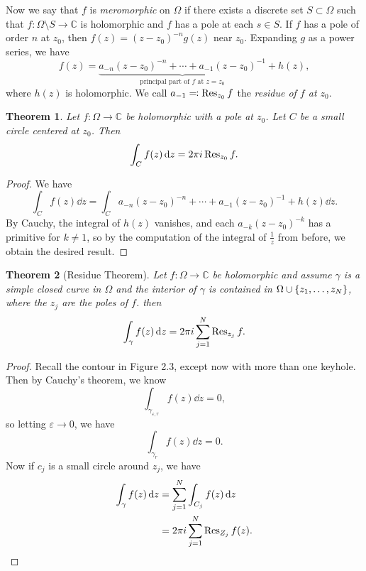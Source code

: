 \documentclass[leqno, openany]{memoir}
\newtheorem{thm}{Theorem}[section]
\theoremstyle{definition}
\theoremstyle{remark}
\theoremstyle{plain}
\theoremstyle{definition}
\theoremstyle{remark}
\newcommand{\C}{\mathbb{C}}
\newcommand{\ep}{\varepsilon}
\begin{document}
Now we say that $f$ is \textit{meromorphic} on $\Omega$ if there exists a discrete set $S \subset \Omega$ such that $f \colon \Omega \setminus S \to \C$ is holomorphic and $f$ has a pole at each $s \in S$. If $f$ has a pole of order $n$ at $z_0$, then $f(z) = (z-z_0)^{-n} g(z)$ near $z_0$. Expanding $g$ as a power series, we have
\[ f(z) = \underbrace{a_{-n} {(z-z_0)}^{-n} + \cdots + a_{-1} {(z-z_0)}^{-1}}_{\text{principal part of $f$ at $z=z_0$}} + h(z), \]
where $h(z)$ is holomorphic. We call $a_{-1} \eqqcolon \Res_{z_0} f$ the \textit{residue of $f$ at $z_0$}.

\begin{thm}
    Let $f \colon \Omega \to \C$ be holomorphic with a pole at $z_0$. Let $C$ be a small circle centered at $z_0$. Then 
    \[ \int_C f(z) \dd{z} = 2 \pi i \Res_{z_0} f. \]
\end{thm}

\begin{proof}
    We have
    \[ \int_C f(z) \dd{z} = \int_C a_{-n} {(z-z_0)}^{-n} + \cdots + a_{-1}{(z-z_0)}^{-1} + h(z) \dd{z}. \]
    By Cauchy, the integral of $h(z)$ vanishes, and each $a_{-k} {(z-z_0)}^{-k}$ has a primitive for $k \neq 1$, so by the computation of the integral of $\frac{1}{z}$ from before, we obtain the desired result.
\end{proof}

\begin{thm}[Residue Theorem]
    Let $f \colon \Omega \to \C$ be holomorphic and assume $\gamma$ is a simple closed curve in $\Omega$ and the interior of $\gamma$ is contained in $\Omega \cup \qty{z_1, \ldots, z_N}$, where the $z_j$ are the poles of $f$. then
    \[ \int_{\gamma} f(z) \dd{z} = 2 \pi i \sum_{j=1}^N \Res_{z_j} f. \]
\end{thm}

\begin{proof}
    Recall the contour in Figure 2.3, except now with more than one keyhole. Then by Cauchy's theorem, we know
    \[ \int_{\gamma_{\ep, r}} f(z) \dd{z} = 0, \]
    so letting $\ep \to 0$, we have
    \[ \int_{\gamma_r} f(z) \dd{z} = 0. \]
    Now if $c_j$ is a small circle around $z_j$, we have 
    \begin{align*}
        \int_{\gamma} f(z) \dd{z} &= \sum_{j=1}^N \int_{C_j} f(z) \dd{z} \\
                                  &= 2 \pi i \sum_{j=1}^N \Res_{Z_j} f(z). \qedhere
    \end{align*}
\end{proof}
\end{document}
